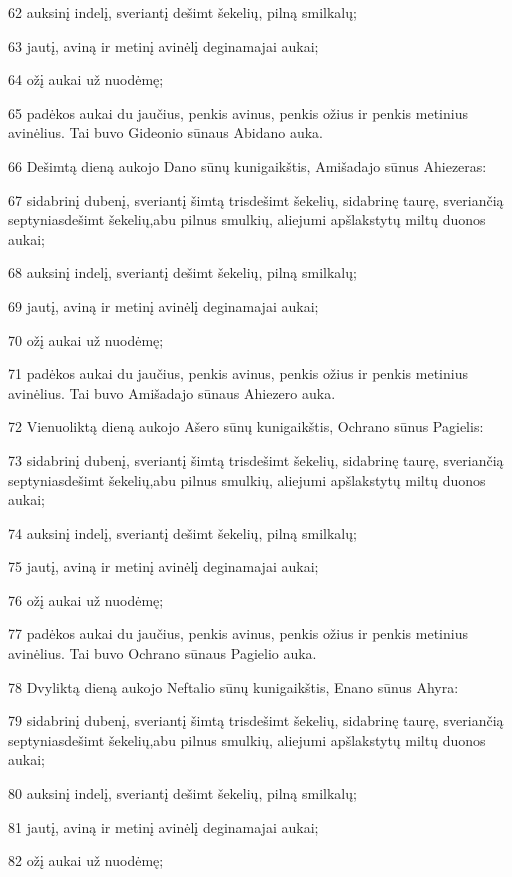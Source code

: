 \par 62 auksinį indelį, sveriantį dešimt šekelių, pilną smilkalų; 
\par 63 jautį, aviną ir metinį avinėlį deginamajai aukai; 
\par 64 ožį aukai už nuodėmę; 
\par 65 padėkos aukai du jaučius, penkis avinus, penkis ožius ir penkis metinius avinėlius. Tai buvo Gideonio sūnaus Abidano auka. 
\par 66 Dešimtą dieną aukojo Dano sūnų kunigaikštis, Amišadajo sūnus Ahiezeras: 
\par 67 sidabrinį dubenį, sveriantį šimtą trisdešimt šekelių, sidabrinę taurę, sveriančią septyniasdešimt šekelių,­abu pilnus smulkių, aliejumi apšlakstytų miltų duonos aukai; 
\par 68 auksinį indelį, sveriantį dešimt šekelių, pilną smilkalų; 
\par 69 jautį, aviną ir metinį avinėlį deginamajai aukai; 
\par 70 ožį aukai už nuodėmę; 
\par 71 padėkos aukai du jaučius, penkis avinus, penkis ožius ir penkis metinius avinėlius. Tai buvo Amišadajo sūnaus Ahiezero auka. 
\par 72 Vienuoliktą dieną aukojo Ašero sūnų kunigaikštis, Ochrano sūnus Pagielis: 
\par 73 sidabrinį dubenį, sveriantį šimtą trisdešimt šekelių, sidabrinę taurę, sveriančią septyniasdešimt šekelių,­abu pilnus smulkių, aliejumi apšlakstytų miltų duonos aukai; 
\par 74 auksinį indelį, sveriantį dešimt šekelių, pilną smilkalų; 
\par 75 jautį, aviną ir metinį avinėlį deginamajai aukai; 
\par 76 ožį aukai už nuodėmę; 
\par 77 padėkos aukai du jaučius, penkis avinus, penkis ožius ir penkis metinius avinėlius. Tai buvo Ochrano sūnaus Pagielio auka. 
\par 78 Dvyliktą dieną aukojo Neftalio sūnų kunigaikštis, Enano sūnus Ahyra: 
\par 79 sidabrinį dubenį, sveriantį šimtą trisdešimt šekelių, sidabrinę taurę, sveriančią septyniasdešimt šekelių,­abu pilnus smulkių, aliejumi apšlakstytų miltų duonos aukai; 
\par 80 auksinį indelį, sveriantį dešimt šekelių, pilną smilkalų; 
\par 81 jautį, aviną ir metinį avinėlį deginamajai aukai; 
\par 82 ožį aukai už nuodėmę; 
